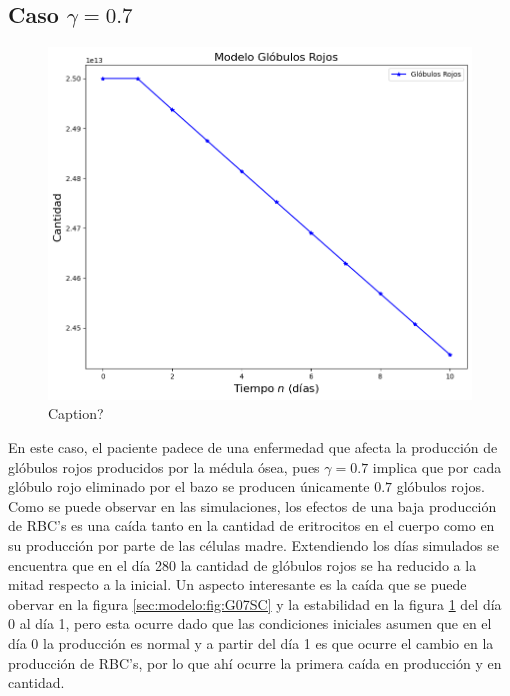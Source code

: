 \subsection{Caso $\gamma=0.7$}
\begin{figure}[h]
    \centering
    \includegraphics[scale=0.55]{figures/BaseG07RBC.png}
    \caption{Caption?}
    \label{sec:modelo:fig:G07RBC}
\end{figure}

En este caso, el paciente padece de una enfermedad que afecta la producción de glóbulos rojos producidos por la médula ósea, pues $\gamma=0.7$ implica que por cada glóbulo rojo eliminado por el bazo se producen únicamente $0.7$ glóbulos rojos. Como se puede observar en las simulaciones, los efectos de una baja producción de RBC's es una caída tanto en la cantidad de eritrocitos en el cuerpo como en su producción por parte de las células madre. Extendiendo los días simulados se encuentra que en el día 280 la cantidad de glóbulos rojos se ha reducido a la mitad respecto a la inicial. Un aspecto interesante es la caída que se puede obervar en la figura \ref{sec:modelo:fig:G07SC} y la estabilidad en la figura \ref{sec:modelo:fig:G07RBC} del día 0 al día 1, pero esta ocurre dado que las condiciones iniciales asumen que en el día 0 la producción es normal y a partir del día 1 es que ocurre el cambio en la producción de RBC's, por lo que ahí ocurre la primera caída en producción y en cantidad. 

